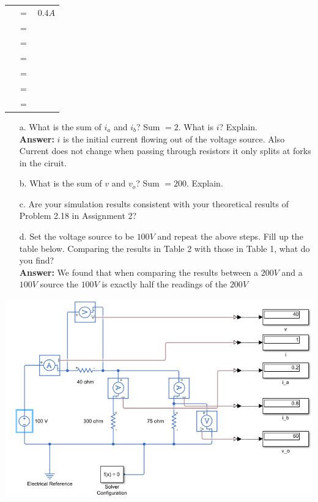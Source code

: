 \documentclass[a4paper]{article}
\begin{document}
\begin{itemize}
\begin{tabular}{rcl}
	      	  & $=$ &  $0.4A$ \\
	      	  & $=$ &   \\
	      	  & $=$ &   \\
	      	  & $=$ &   \\
	      	  & $=$ &   \\
	      	  & $=$ &   \\
	      	  & $=$ &   \\
	      \end{tabular}
	      \begin{itemize}
	      	\item[a.] What is the sum of $i_{a}$ and $i_{b}$? Sum $= 2$. What is $i$? Explain. \\
	      	      \textbf{Answer:} $i$ is the initial current flowing out of the voltage source. Also Current does not change when passing through resistors it only splits at forks in the ciruit.
	      	\item[b.] What is the sum of $v$ and $v_{o}$? Sum $= 200$. Explain.
	      	\item[c.] Are your simulation results consistent with your theoretical results of Problem 2.18 in Assignment 2?
	      	\item[d.] Set the voltage source to be $100 V$ and repeat the above steps. Fill up the table below. Comparing the results in Table 2 with those in Table 1, what do you find? \\
	      	      \textbf{Answer:} We found that when comparing the results between a $200V$ and a $100V$ source the $100V$ is exactly half the readings of the $200V$   
	      \end{itemize}
	      \includegraphics[scale=0.5]{circuit-1+100.png}\\

\end{itemize}
\end{document}

